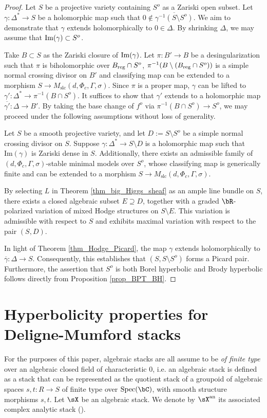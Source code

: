 \documentclass[11pt,letterpaper]{amsart}
\numberwithin{equation}{section}
\begin{document}
	\begin{proof}
		Let $S$ be a projective variety containing $S^o$ as a Zariski open subset. 
		Let $\gamma: \Delta^\ast \to S$ be a holomorphic map such that $0 \notin \overline{\gamma^{-1}(S \setminus S^o)}$. We aim to demonstrate that $\gamma$ extends holomorphically to $0 \in \Delta$. By shrinking $\Delta$, we may assume that ${\rm Im}(\gamma) \subset S^o$.  
		
		Take $B \subset S$ as the Zariski closure of ${\rm Im}(\gamma)$. Let $\pi: B' \to B$ be a desingularization such that $\pi$ is biholomorphic over $B_{\rm reg} \cap S^o$, $\pi^{-1}(B \setminus (B_{\rm reg} \cap S^o))$ is a simple normal crossing divisor on $B'$ and classifying map can be extended to a morphism $S \to M_{\text{slc}}(d, \Phi_c, \Gamma, \sigma)$. Since $\pi$ is a proper map, $\gamma$ can be lifted to $\gamma': \Delta^\ast \to \pi^{-1}(B \cap S^o)$. It suffices to show that $\gamma'$ extends to a holomorphic map $\overline{\gamma'}: \Delta \to B'$. By taking the base change of $f^o$ via $\pi^{-1}(B \cap S^o) \to S^o$, we may proceed under the following assumptions without loss of generality.
		\begin{framed}
			Let $S$ be a smooth projective variety, and let $D := S \setminus S^o$ be a simple normal crossing divisor on $S$. Suppose $\gamma: \Delta^\ast \to S \setminus D$ is a holomorphic map such that $\text{Im}(\gamma)$ is Zariski dense in $S$. Additionally, there exists an admissible family of $(d, \Phi_c, \Gamma, \sigma)$-stable minimal models over $S^o$, whose classifying map is generically finite and can be extended to a morphism $S \to M_{\text{slc}}(d, \Phi_c, \Gamma, \sigma)$.
		\end{framed}
		By selecting $L$ in Theorem \ref{thm_big_Higgs_sheaf} as an ample line bundle on $S$, there exists a closed algebraic subset $E \supseteq D$, together with a graded $\bR$-polarized variation of mixed Hodge structures on $S \setminus E$. This variation is admissible with respect to $S$ and exhibits maximal variation with respect to the pair $(S, D)$.  
		
		In light of Theorem \ref{thm_Hodge_Picard}, the map $\gamma$ extends holomorphically to $\overline{\gamma}: \Delta \to S$. Consequently, this establishes that $(S, S \setminus S^o)$ forms a Picard pair. Furthermore, the assertion that $S^o$ is both Borel hyperbolic and Brody hyperbolic follows directly from Proposition \ref{prop_BPT_BH}.
	\end{proof}

    \section{Hyperbolicity properties for Deligne-Mumford stacks}
    For the purposes of this paper, algebraic stacks are all assume to be \emph{of finite type} over an algebraic closed field of characteristic 0, i.e. an algebraic stack is defined as a stack that can be represented as the quotient stack of a groupoid of algebraic spaces $s,t: R \to S$ of finite type over ${\rm Spec}(\bC)$, with smooth structure morphisms $s,t$.      
    Let $\sX$ be an algebraic stack. We denote by $\sX^{\rm an}$ its associated complex analytic stack (\cite{Noohi2005,Behrend2006}).
\end{document}
